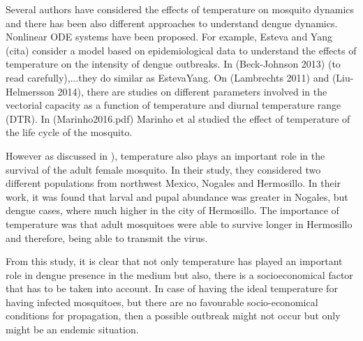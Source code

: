 \noindent Several authors have considered the effects of temperature on mosquito dynamics and there has been also different approaches to understand dengue dynamics. Nonlinear ODE systems have been proposed. For example, Esteva and Yang (cita) consider a model based on epidemiological data to understand the effects of temperature on the intensity of dengue outbreaks. In (Beck-Johnson 2013) (to read carefully),...they do similar as EstevaYang. On (Lambrechts 2011) and (Liu-Helmersson 2014), there are studies on different parameters involved in the vectorial capacity as a function of temperature and diurnal temperature range (DTR). In (Marinho2016.pdf) Marinho et al studied the effect of temperature of the life cycle of the mosquito.


\noindent However as discussed in \cite{Ernst2016}), temperature also plays an important role in the survival of the adult female mosquito. In their study, they considered two different populations from northwest Mexico, Nogales and Hermosillo. In their work, it was found that larval and pupal abundance was greater in Nogales, but dengue cases, where much higher in the city of Hermosillo. The importance of temperature was that adult mosquitoes were able to survive longer in Hermosillo and therefore, being able to transmit the virus.

\noindent From this study, it is clear that not only temperature has played an important role in dengue presence in the medium but also, there is a socioeconomical factor that has to be taken into account. In case of having the ideal temperature for having infected mosquitoes, but there are no favourable socio-economical conditions for propagation, then a possible outbreak might not occur but only might be an endemic situation.

